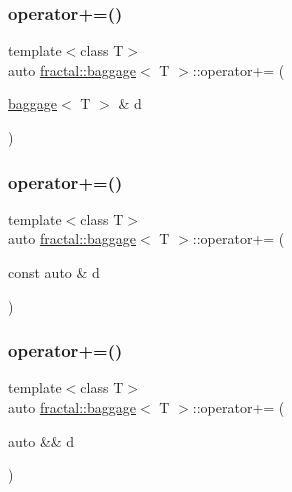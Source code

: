 \mbox{\label{classfractal_1_1baggage_a8a9085951c8eb400af15d2a9fd34e525}} 
\subsubsection{\texorpdfstring{operator+=()}{operator+=()}\hspace{0.1cm}{\footnotesize\ttfamily [1/3]}}
{\footnotesize\ttfamily template$<$class T$>$ \\
auto \hyperlink{classfractal_1_1baggage}{fractal\+::baggage}$<$ T $>$\+::operator+= (\begin{DoxyParamCaption}\item[{\hyperlink{classfractal_1_1baggage}{baggage}$<$ T $>$ \&}]{d }\end{DoxyParamCaption})\hspace{0.3cm}{\ttfamily [inline]}}

\mbox{\label{classfractal_1_1baggage_ac97b2def4fa217147174cac53fc9cef8}} 
\subsubsection{\texorpdfstring{operator+=()}{operator+=()}\hspace{0.1cm}{\footnotesize\ttfamily [2/3]}}
{\footnotesize\ttfamily template$<$class T$>$ \\
auto \hyperlink{classfractal_1_1baggage}{fractal\+::baggage}$<$ T $>$\+::operator+= (\begin{DoxyParamCaption}\item[{const auto \&}]{d }\end{DoxyParamCaption})\hspace{0.3cm}{\ttfamily [inline]}}

\mbox{\label{classfractal_1_1baggage_a5c290afd60258b17b78f85eee6dc022d}} 
\subsubsection{\texorpdfstring{operator+=()}{operator+=()}\hspace{0.1cm}{\footnotesize\ttfamily [3/3]}}
{\footnotesize\ttfamily template$<$class T$>$ \\
auto \hyperlink{classfractal_1_1baggage}{fractal\+::baggage}$<$ T $>$\+::operator+= (\begin{DoxyParamCaption}\item[{auto \&\&}]{d }\end{DoxyParamCaption})\hspace{0.3cm}{\ttfamily [inline]}}

